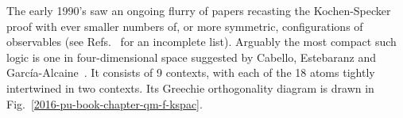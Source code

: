 \documentclass[%
  twocolumn,
 showpacs,
 showkeys,
 preprintnumbers,
 amsmath,amssymb,
 aps,
  pra,
  longbibliography,
 floatfix,
 ]{revtex4-1}
\begin{document}
The early 1990's saw an ongoing flurry of papers recasting the Kochen-Specker proof with ever smaller numbers of,
or more symmetric, configurations of
observables
(see Refs.~\cite{peres-91,penrose-ks,Peres:1996fk,Kernaghan-1994,mermin-93,bub,svozil-tkadlec,tkadlec-96,cabello-96,Cabello-1996ega,CalHerSvo-tatra,tkadlec-00,tkadlec-01,pavicic:inria-00070615,Smith-2004,Pavicic-2005,Arends2011,Waegell-2011,1751-8121-44-50-505303,Planat2012,PhysRevLett.108.030402,Cabello-2014-PhysRevA.89.042101} for an incomplete list).
Arguably the most compact such logic is one in four-dimensional space suggested by Cabello, Estebaranz and Garc{\'{i}}a-Alcaine~\cite{cabello-96,cabello-99,Pavicic-2005}.
It consists of 9 contexts, with each of the 18 atoms tightly intertwined in two contexts.
Its Greechie orthogonality diagram is drawn in Fig.~\ref{2016-pu-book-chapter-qm-f-kspac}.
\end{document}
